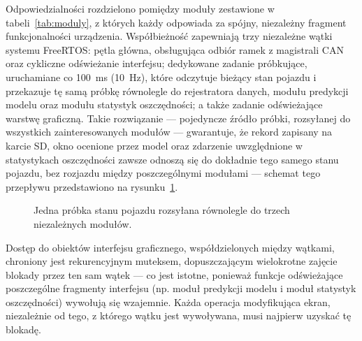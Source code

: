 Odpowiedzialności rozdzielono pomiędzy moduły zestawione w
tabeli~\ref{tab:moduly}, z których każdy odpowiada za spójny, niezależny
fragment funkcjonalności urządzenia. Współbieżność zapewniają trzy
niezależne wątki systemu FreeRTOS: pętla główna, obsługująca odbiór ramek
z magistrali CAN oraz cykliczne odświeżanie interfejsu; dedykowane zadanie
próbkujące, uruchamiane co 100~ms (10~Hz), które odczytuje bieżący stan
pojazdu i przekazuje tę samą próbkę równolegle do rejestratora danych, modułu
predykcji modelu oraz modułu statystyk oszczędności; a także zadanie
odświeżające warstwę graficzną. Takie rozwiązanie --- pojedyncze źródło
próbki, rozsyłanej do wszystkich zainteresowanych modułów --- gwarantuje, że
rekord zapisany na karcie SD, okno ocenione przez model oraz zdarzenie
uwzględnione w statystykach oszczędności zawsze odnoszą się do dokładnie
tego samego stanu pojazdu, bez rozjazdu między poszczególnymi modułami ---
schemat tego przepływu przedstawiono na rysunku~\ref{fig:fanout-probka}.

\begin{figure}[!h]
    \centering
    \resizebox{0.8\linewidth}{!}{}
    \caption{Jedna próbka stanu pojazdu rozsyłana równolegle do trzech niezależnych modułów.}
    \label{fig:fanout-probka}
\end{figure}

Dostęp do obiektów interfejsu graficznego, współdzielonych między wątkami,
chroniony jest rekurencyjnym muteksem, dopuszczającym wielokrotne zajęcie
blokady przez ten sam wątek --- co jest istotne, ponieważ funkcje
odświeżające poszczególne fragmenty interfejsu (np. moduł predykcji modelu
i moduł statystyk oszczędności) wywołują się wzajemnie. Każda operacja
modyfikująca ekran, niezależnie od tego, z którego wątku jest wywoływana,
musi najpierw uzyskać tę blokadę.

